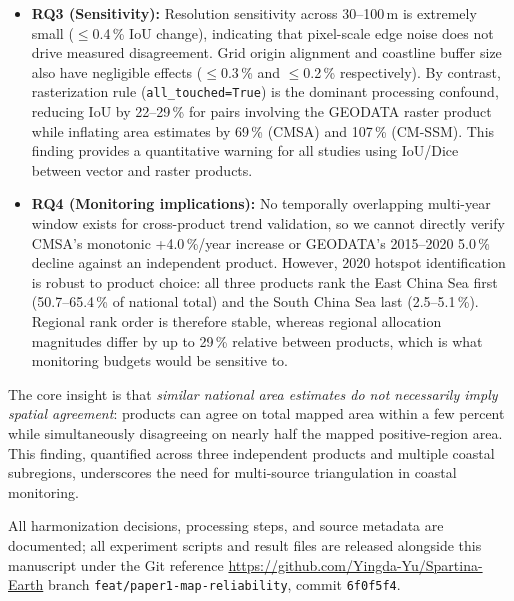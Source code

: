 \documentclass[11pt]{article}
\begin{document}
\begin{itemize}[nosep]
  cannot be established as the sole cause without reference data; and a
  coverage-normalized IoU is not computable from the delivered entities,
  so all agreement is measured on the shared domain under an explicit
  "not mapped as presence == absence" assumption.
\item \textbf{RQ3 (Sensitivity):} Resolution sensitivity across 30--100\,m is
  extremely small ($\leq$0.4\,\% IoU change), indicating that pixel-scale edge
  noise does not drive measured disagreement. Grid origin alignment and
  coastline buffer size also have negligible effects ($\leq$0.3\,\% and
  $\leq$0.2\,\% respectively). By contrast, rasterization rule
  (\texttt{all\_touched=True}) is the dominant processing confound, reducing
  IoU by 22--29\,\% for pairs involving the GEODATA raster product while
  inflating area estimates by 69\,\% (CMSA) and 107\,\% (CM-SSM). This finding
  provides a quantitative warning for all studies using IoU/Dice between
  vector and raster products.
\item \textbf{RQ4 (Monitoring implications):} No temporally overlapping
  multi-year window exists for cross-product trend validation, so we cannot
  directly verify CMSA's monotonic +4.0\,\%/year increase or GEODATA's
  2015--2020 5.0\,\% decline against an independent product. However, 2020
  hotspot identification is robust to product choice: all three products rank
  the East China Sea first (50.7--65.4\,\% of national total) and the South
  China Sea last (2.5--5.1\,\%). Regional rank order is therefore stable,
  whereas regional allocation magnitudes differ by up to 29\,\% relative
  between products, which is what monitoring budgets would be sensitive to.
\end{itemize}

The core insight is that \emph{similar national area estimates do not necessarily
imply spatial agreement}: products can agree on total mapped area within a few
percent while simultaneously disagreeing on nearly half the mapped positive-region
area. This finding, quantified across three independent products and multiple
coastal subregions, underscores the need for multi-source triangulation in
coastal monitoring.

All harmonization decisions, processing steps, and source metadata are
documented; all experiment scripts and result files are released alongside
this manuscript under the Git reference
\url{https://github.com/Yingda-Yu/Spartina-Earth} branch
\texttt{feat/paper1-map-reliability}, commit \texttt{6f0f5f4}.
\end{document}

